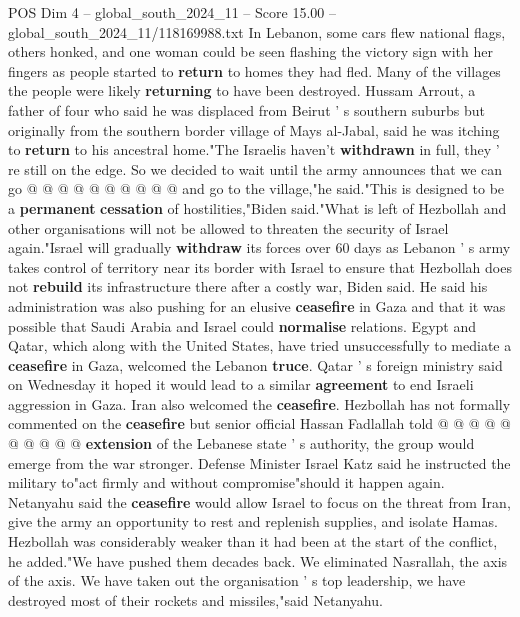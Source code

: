 \begin{textsample}{POS Dim 4 – global\_south\_2024\_11 – Score 15.00 – global\_south\_2024\_11/118169988.txt}
In Lebanon, some cars flew national flags, others honked, and one woman could be seen flashing the victory sign with her fingers as people started to \textbf{return} to homes they had fled.
Many of the villages the people were likely \textbf{returning} to have been destroyed.
Hussam Arrout, a father of four who said he was displaced from Beirut ' s southern suburbs but originally from the southern border village of Mays al-Jabal, said he was itching to \textbf{return} to his ancestral home."The Israelis haven't \textbf{withdrawn} in full, they ' re still on the edge.
So we decided to wait until the army announces that we can go @ @ @ @ @ @ @ @ @ @ and go to the village,"he said."This is designed to be a \textbf{permanent} \textbf{cessation} of hostilities,"Biden said."What is left of Hezbollah and other organisations will not be allowed to threaten the security of Israel again."Israel will gradually \textbf{withdraw} its forces over 60 days as Lebanon ' s army takes control of territory near its border with Israel to ensure that Hezbollah does not \textbf{rebuild} its infrastructure there after a costly war, Biden said.
He said his administration was also pushing for an elusive \textbf{ceasefire} in Gaza and that it was possible that Saudi Arabia and Israel could \textbf{normalise} relations.
Egypt and Qatar, which along with the United States, have tried unsuccessfully to mediate a \textbf{ceasefire} in Gaza, welcomed the Lebanon \textbf{truce}.
Qatar ' s foreign ministry said on Wednesday it hoped it would lead to a similar \textbf{agreement} to end Israeli aggression in Gaza.
Iran also welcomed the \textbf{ceasefire}.
Hezbollah has not formally commented on the \textbf{ceasefire} but senior official Hassan Fadlallah told @ @ @ @ @ @ @ @ @ @ \textbf{extension} of the Lebanese state ' s authority, the group would emerge from the war stronger.
Defense Minister Israel Katz said he instructed the military to"act firmly and without compromise"should it happen again.
Netanyahu said the \textbf{ceasefire} would allow Israel to focus on the threat from Iran, give the army an opportunity to rest and replenish supplies, and isolate Hamas.
Hezbollah was considerably weaker than it had been at the start of the conflict, he added."We have pushed them decades back.
We eliminated Nasrallah, the axis of the axis.
We have taken out the organisation ' s top leadership, we have destroyed most of their rockets and missiles,"said Netanyahu.

\end{textsample}
